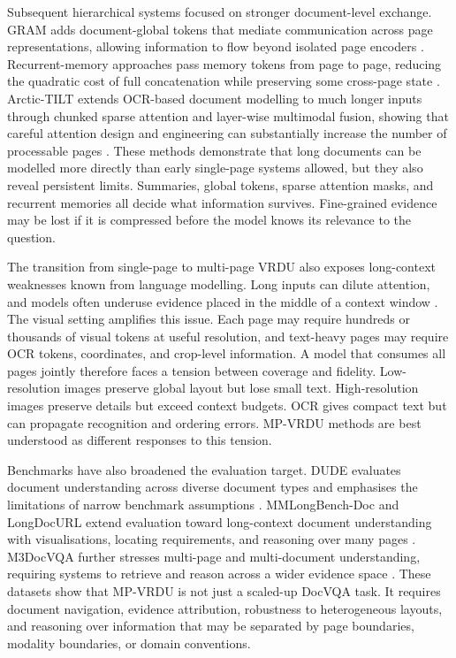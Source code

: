 \documentclass[10pt,a4paper]{article}
\begin{document}
Subsequent hierarchical systems focused on stronger document-level exchange. GRAM adds document-global tokens that mediate communication across page representations, allowing information to flow beyond isolated page encoders \cite{blau2024gram}. Recurrent-memory approaches pass memory tokens from page to page, reducing the quadratic cost of full concatenation while preserving some cross-page state \cite{dong2024multi}. Arctic-TILT extends OCR-based document modelling to much longer inputs through chunked sparse attention and layer-wise multimodal fusion, showing that careful attention design and engineering can substantially increase the number of processable pages \cite{borchmann2025arctic}. These methods demonstrate that long documents can be modelled more directly than early single-page systems allowed, but they also reveal persistent limits. Summaries, global tokens, sparse attention masks, and recurrent memories all decide what information survives. Fine-grained evidence may be lost if it is compressed before the model knows its relevance to the question.

The transition from single-page to multi-page VRDU also exposes long-context weaknesses known from language modelling. Long inputs can dilute attention, and models often underuse evidence placed in the middle of a context window \cite{liu2024lost}. The visual setting amplifies this issue. Each page may require hundreds or thousands of visual tokens at useful resolution, and text-heavy pages may require OCR tokens, coordinates, and crop-level information. A model that consumes all pages jointly therefore faces a tension between coverage and fidelity. Low-resolution images preserve global layout but lose small text. High-resolution images preserve details but exceed context budgets. OCR gives compact text but can propagate recognition and ordering errors. MP-VRDU methods are best understood as different responses to this tension.

Benchmarks have also broadened the evaluation target. DUDE evaluates document understanding across diverse document types and emphasises the limitations of narrow benchmark assumptions \cite{van2023document}. MMLongBench-Doc and LongDocURL extend evaluation toward long-context document understanding with visualisations, locating requirements, and reasoning over many pages \cite{ma2024mmlongbench,deng2025longdocurl}. M3DocVQA further stresses multi-page and multi-document understanding, requiring systems to retrieve and reason across a wider evidence space \cite{cho2025m3docvqa}. These datasets show that MP-VRDU is not just a scaled-up DocVQA task. It requires document navigation, evidence attribution, robustness to heterogeneous layouts, and reasoning over information that may be separated by page boundaries, modality boundaries, or domain conventions.
\end{document}
